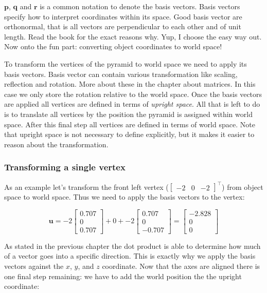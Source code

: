 $\textbf{p}$, $\textbf{q}$ and $\textbf{r}$ is a common notation to denote the basis vectors. Basis vectors specify how to interpret coordinates within its space. Good basis vector are orthonormal, that is all vectors are perpendicular to each other and of unit length. Read the book for the exact reasons why. Yup, I choose the easy way out. Now onto the fun part: converting object coordinates to world space!

To transform the vertices of the pyramid to world space we need to apply its basis vectors. Basis vector can contain various transformation like scaling, reflection and rotation. More about these in the chapter about matrices. In this case we only store the rotation relative to the world space. Once the basis vectors are applied all vertices are defined in terms of \textit{upright space}. All that is left to do is to translate all vertices by the position the pyramid is assigned within world space. After this final step all vertices are defined in terms of world space. Note that upright space is not necessary to define explicitly, but it makes it easier to reason about the transformation.

\subsubsection{Transforming a single vertex}

As an example let's transform the front left vertex ($\begin{bmatrix}
		-2 & 0 & -2
	\end{bmatrix}^\intercal$) from object space to world space. Thus we need to apply the basis vectors to the vertex:

$$\textbf{u}=-2\begin{bmatrix}0.707 \\ 0 \\ 0.707\end{bmatrix}+0+-2\begin{bmatrix}0.707 \\ 0 \\ -0.707\end{bmatrix}=\begin{bmatrix}-2.828 \\ 0 \\ 0\end{bmatrix}$$

As stated in the previous chapter the dot product is able to determine how much of a vector goes into a specific direction. This is exactly why we apply the basis vectors against the $x$, $y$, and $z$ coordinate. Now that the axes are aligned there is one final step remaining: we have to add the world position the the upright coordinate:

